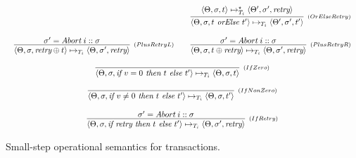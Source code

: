 \documentclass{jfp1}
\newcommand{\If}{\textit{if }}
\newcommand{\Then}{\textit{ then }}
\newcommand{\Else}{\textit{ else }}
\newcommand{\Retry}{\textit{retry}}
\newcommand{\OrElse}{\textit{ orElse }}
\newcommand{\TStep}[9]{\ensuremath{\langle  #2, #3, #4 \rangle
    \mapsto_{T_{#5}} \langle  #7, #8, #9 \rangle}}
\newcommand{\TStepClos}[9]{\ensuremath{\langle #2, #3, #4 \rangle
    \mapsto^{\star}_{T_{#5}} \langle #7, #8, #9 \rangle}}
\begin{document}
\begin{figure}[h]
\[\begin{array}{c}
\begin{array}{ccc}
                             & &
                    \infer[_{(OrElseRetry)}]
                             {\TStep{h}{\Theta}{\sigma}{t \OrElse t'}{i}{h'}{\Theta'}{\sigma'}{t'}}
                             {\TStepClos{h}{\Theta}{\sigma}{t}{i}{h}{\Theta'}{\sigma'}{\Retry}}                              
                    \\ \\ 
                    \infer[_{(PlusRetryL)}]
                             {\TStep{h}{\Theta}{\sigma}{\Retry \oplus t}{i}{h}{\Theta}{\sigma'}{\Retry}}
                             {\sigma' = Abort\:i :: \sigma} & &
                    \infer[_{(PlusRetryR)}]
                             {\TStep{h}{\Theta}{\sigma}{t \oplus \Retry}{i}{h}{\Theta}{\sigma'}{\Retry}}
                             {\sigma' = Abort\:i :: \sigma} \\ \\
                    \multicolumn{3}{c}{
                    \infer[_{(IfZero)}]
                             {\TStep{h}{\Theta}{\sigma}{\If v = 0
                    \Then t \Else t'}{i}{h}{\Theta}{\sigma}{t}}{}}
                    \\
                    \\
                    \multicolumn{3}{c}{
                    \infer[_{(IfNonZero)}]
                             {\TStep{h}{\Theta}{\sigma}{\If v \neq 0
                    \Then t \Else t'}{i}{h}{\Theta}{\sigma}{t'}}{}} \\
                    \\
                    \multicolumn{3}{c}{
                    \infer[_{(IfRetry)}]
                             {\TStep{h}{\Theta}{\sigma}{\If \Retry
                    \Then t \Else t'}{i}{h}{\Theta}{\sigma'}{\Retry}}
                    {\sigma' = Abort\:i :: \sigma}} 
                  \end{array}
             \end{array}
         \]
         \centering
         \caption{Small-step operational semantics for transactions.}
         \label{fig:small-step-transactions}
     \end{figure}
\end{document}
